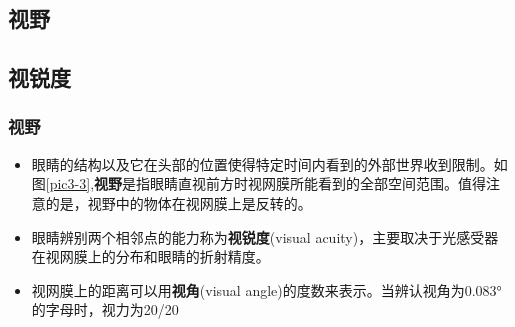 \subsection{视野}
\subsection{视锐度}

\begin{frame}
    \frametitle{视野}
    \begin{itemize}
        \item 眼睛的结构以及它在头部的位置使得特定时间内看到的外部世界收到限制。如图\ref{pic3-3},\textbf{视野}是指眼睛直视前方时视网膜所能看到的全部空间范围。值得注意的是，视野中的物体在视网膜上是反转的。
        \item 眼睛辨别两个相邻点的能力称为\textbf{视锐度}(visual acuity)，主要取决于光感受器在视网膜上的分布和眼睛的折射精度。
        \item 视网膜上的距离可以用\textbf{视角}(visual angle)的度数来表示。当辨认视角为0.083°的字母时，视力为20/20
    \end{itemize}

    \begin{figure}
        \centering
    \end{figure}
\end{frame}
